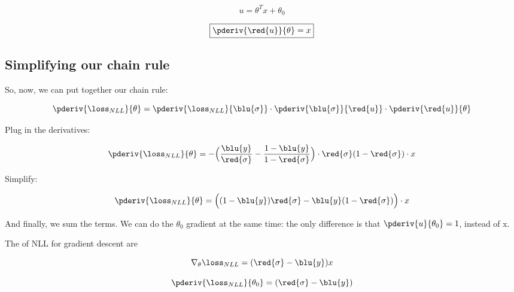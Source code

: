         \begin{equation}
            u = \theta^Tx+\theta_0
        \end{equation}
        
        \begin{equation}
        \boxed{
            \pderiv{\red{u}}{\theta} = x
        }
        \end{equation}
        
    \subsection*{Simplifying our chain rule}
    
        So, now, we can put together our chain rule:
        
        \begin{equation}
            \pderiv{ \loss_{NLL} }{ \theta } 
            = 
            \pderiv{ \loss_{NLL} }{ \blu{\sigma} } 
            \cdot 
            \pderiv{ \blu{\sigma} }{\red{u}} 
            \cdot 
            \pderiv{\red{u}}{\theta}
        \end{equation}
        
        Plug in the derivatives:
        
        \begin{equation}
            \pderiv{ \loss_{NLL} }{ \theta } 
            = 
            -
            \Big(
                \frac{ \blu{y} } { \red{\sigma} } 
                -
                \frac{ 1-\blu{y} } { 1 - \red{\sigma} }
            \Big)
            \cdot
            \red{\sigma} (1-\red{\sigma})
            \cdot 
            x
        \end{equation}
        
        Simplify:
        
        \begin{equation}
            \pderiv{ \loss_{NLL} }{ \theta } 
            = 
            \Big(
                (1-\blu{y})\red{\sigma} 
                -
                \blu{y}(1-\red{\sigma})
            \Big)
            \cdot 
            x
        \end{equation}
        
        And finally, we sum the terms. We can do the $\theta_0$ gradient at the same time: the only difference is that $\pderiv{u}{\theta_0}=1$, instead of x.\\
        
        \begin{kequation}
            The  of NLL for gradient descent are
            
            \begin{equation*}
                \nabla_\theta \loss_{NLL} 
                =
                (\red{\sigma} - \blu{y})x
            \end{equation*}
            
            \begin{equation*}
                \pderiv{\loss_{NLL}}{\theta_0}
                =
                (\red{\sigma} - \blu{y})
            \end{equation*}
        \end{kequation}
        
